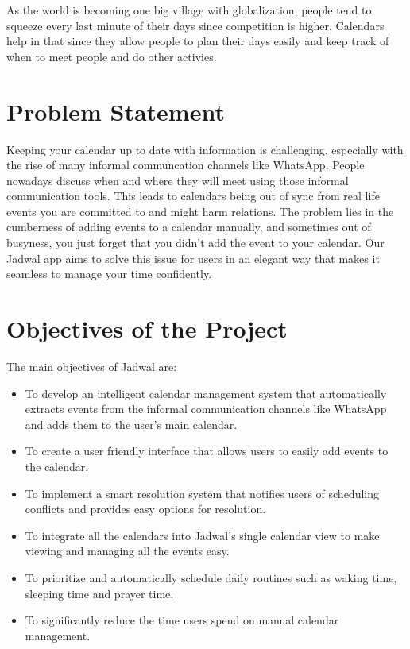 \documentclass[12pt,a4paper]{report}
\begin{document}
As the world is becoming one big village with globalization, people tend to squeeze every last minute of their days since competition is higher. Calendars help in that since they allow people to plan their days easily and keep track of when to meet people and do other activies.

\section{Problem Statement}

Keeping your calendar up to date with information is challenging, especially with the rise of many informal communcation channels like WhatsApp. People nowadays discuss when and where they will meet using those informal communication tools. This leads to calendars being out of sync from real life events you are committed to and might harm relations. The problem lies in the cumberness of adding events to a calendar manually, and sometimes out of busyness, you just forget that you didn't add the event to your calendar. Our Jadwal app aims to solve this issue for users in an elegant way that makes it seamless to manage your time confidently.

\section{Objectives of the Project}

The main objectives of Jadwal are:

\begin{itemize}
    \item To develop an intelligent calendar management system that automatically extracts events from the informal communication channels like WhatsApp and adds them to the user's main calendar.
    \item To create a user friendly interface that allows users to easily add events to the calendar.
    \item To implement a smart resolution system that notifies users of scheduling conflicts and provides easy options for resolution.
    \item To integrate all the calendars into Jadwal's single calendar view to make viewing and managing all the events easy.
    \item To prioritize and automatically schedule daily routines such as waking time, sleeping time and prayer time.
    \item To significantly reduce the time users spend on manual calendar management.
\end{itemize}
\end{document}
